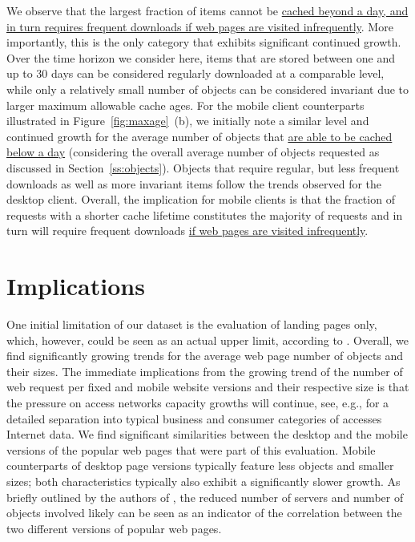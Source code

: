 \documentclass[onecolumn,12pt]{IEEEtran}
\begin{document}
We observe that the largest fraction of items cannot be \uline{cached beyond a day, and in turn requires frequent downloads if web pages are visited infrequently}. 
More importantly, this is the only category that exhibits significant continued growth.
Over the time horizon we consider here, items that are stored between one and up to 30 days can be considered regularly downloaded at a comparable level, while only a relatively small number of objects can be considered invariant due to larger maximum allowable cache ages.
For the mobile client counterparts illustrated in Figure~\ref{fig:maxage}~(b), we initially note a similar level and continued growth for the average number of objects that \uline{are able to be cached below a day} (considering the overall average number of objects requested as discussed in Section~\ref{ss:objects}).
Objects that require regular, but less frequent downloads as well as more invariant items follow the trends observed for the desktop client.
Overall, the implication for mobile clients is that the fraction of requests with a shorter cache lifetime constitutes the majority of requests and in turn will require frequent downloads \uline{if web pages are visited infrequently}.







\section{Implications}
\label{s:discuss}
One initial limitation of our dataset is the evaluation of landing pages only, which, however, could be seen as an actual upper limit, according to \cite{BuMaSe13}. 
Overall, we find significantly growing trends for the average web page number of objects and their sizes.
The immediate implications from the growing trend of the number of web request per fixed and mobile website versions and their respective size is that the pressure on access networks capacity growths will continue, see, e.g., \cite{Ci13} for a detailed separation into typical business and consumer categories of accesses Internet data.
We find significant similarities between the desktop and the mobile versions of the popular web pages that were part of this evaluation. 
Mobile counterparts of desktop page versions typically feature less objects and smaller sizes; both characteristics typically also exhibit a significantly slower growth.
As briefly outlined by the authors of \cite{BuMaSe13}, the reduced number of servers and number of objects involved likely can be seen as an indicator of the correlation between the two different versions of popular web pages.
\end{document}

